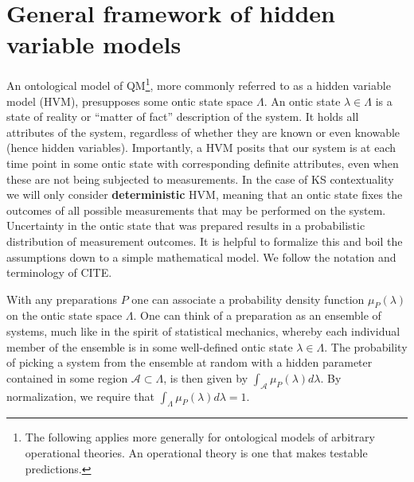 \section{General framework of hidden variable models}
\label{sec:hvm}
An ontological model of QM\footnote{The following applies more generally for ontological models of arbitrary operational theories. An operational theory is one that makes testable predictions.}, more commonly referred to as a hidden variable model (HVM), presupposes some ontic state space $\Lambda$. An ontic state $\lambda\in\Lambda$ is a state of reality or “matter of fact” description of the system. It holds all attributes of the system, regardless of whether they are known or even knowable (hence hidden variables). Importantly, a HVM posits that our system is at each time point in some ontic state with corresponding definite attributes, even when these are not being subjected to measurements. In the case of KS contextuality we will only consider \textbf{deterministic} HVM, meaning that an ontic state fixes the outcomes of all possible measurements that may be performed on the system. Uncertainty in the ontic state that was prepared results in a probabilistic distribution of measurement outcomes. It is helpful to formalize this and boil the assumptions down to a simple mathematical model. We follow the notation and terminology of CITE.

With any preparations $P$ one can associate a probability density function $\mu_{P}(\lambda)$ on the ontic state space $\Lambda$. One can think of a preparation as an ensemble of systems, much like in the spirit of statistical mechanics, whereby each individual member of the ensemble is in some well-defined ontic state $\lambda\in\Lambda$. The probability of picking a system from the ensemble at random with a hidden parameter contained in some region $\mathcal{A}\subset\Lambda$, is then given by $\int_{\mathcal{A}}\mu_{P}(\lambda)d\lambda$. By normalization, we require that $\int_{\Lambda}\mu_{P}(\lambda)d\lambda=1$.

